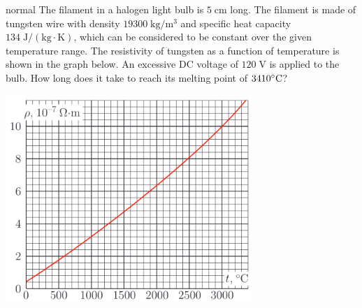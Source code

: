\hypertarget{P44}{}
\begin{solution}{normal} %
The filament in a halogen light bulb is $5\;\text{cm}$ long. The filament is made of tungsten wire with density $19300\;\text{kg}/\text{m}^3$ and specific heat capacity $134\;\text{J}/(\text{kg}\cdot\text{K})$, which can be considered to be constant over the given temperature range. The resistivity of tungsten as a function of temperature is shown in the graph below. An excessive DC voltage of $120\;\text{V}$ is applied to the bulb. How long does it take to reach its melting point of $3410\degree\text{C}$?
\begin{center}
    \includegraphics[width=0.7\textwidth]{S1 Figures/S1-44.png}
\end{center}
\end{solution}